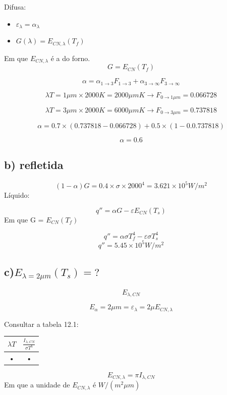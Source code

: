 \documentclass[a4paper, 12pt]{article}
\begin{document}
Difusa:

\begin{itemize}
\item $\varepsilon _{\lambda} = \alpha _{\lambda}$
\item $G(\lambda) = E_{CN,\lambda}(T_{f})$
\end{itemize}

Em que $E_{CN,\lambda}$ é a do forno.
\[G = E_{CN}(T_{f})\]

\[
\alpha = \alpha _{1 \rightarrow 3}F_{1 \rightarrow 3} + \alpha _{3 \rightarrow \infty}F_{3 \rightarrow \infty}
\]

\[
\lambda T = 1 \mu m \times 2000K = 2000 \mu mK \rightarrow F_{0 \rightarrow 1\mu m} = 0.066728
\]

\[
\lambda T = 3 \mu m \times 2000K = 6000 \mu mK \rightarrow F_{0 \rightarrow 3\mu m} = 0.737818
\]

\[
\alpha = 0.7 \times (0.737818 - 0.066728)+0.5 \times (1-0.0.737818)
\]

\[\alpha = 0.6\]


\subsection{b) refletida}

\[(1-\alpha)G=0.4 \times \sigma \times 2000^{4} = 3.621 \times 10 ^{5} W/m^{2}\]
Líquido:

\[q'' = \alpha G - \varepsilon E_{CN}(T_{s})\]
Em 	que G = $E_{CN}(T_{f})$

\[q'' = \alpha \sigma T_{f}^{4} - \varepsilon  \sigma T_{s}^{4}\]
\[q'' = 5.45 \times 10^{5} W/m^{2}\]

\subsection{c)$E_{\lambda=2 \mu m}(T_{s}) = ?$  }


\[E_{\lambda , CN}\]

\[
E_{\alpha} = 2 \mu m = \varepsilon _{\lambda} = 2 \mu E_{CN,\lambda}
\]

Consultar a tabela 12.1:\ \ \ \ \ 
\begin{tabular}{|c|c|}
\hline 
$\lambda T$ & $\frac{I_{\lambda , CN}}{\sigma T^{5}}$ \\ 
\hline 
• & • \\ 
\hline 
\end{tabular} 

\[E_{CN,\lambda} = \pi I_{\lambda,CN}\]
Em que a unidade de $E_{CN,\lambda}$ é $W/(m^{2} \mu m)$
\end{document}
